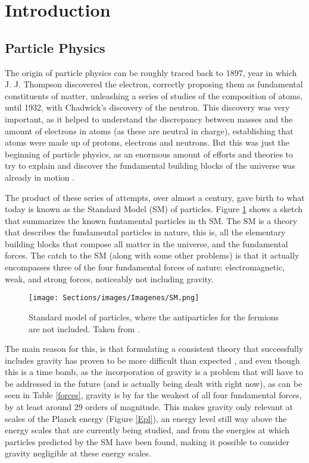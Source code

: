 \clearpage
\vspace{1cm}
\section{Introduction} \label{sec:intro}
\vspace{1cm}

\subsection{Particle Physics} \label{ssec:partphys}

The origin of particle physics can be roughly traced back to 1897, year in which J. J. Thompson discovered the electron, correctly proposing them as fundamental constituents of matter, unleashing a series of studies of the composition of atoms, until 1932, with Chadwick's discovery of the neutron. This discovery was very important, as it helped to understand the discrepancy between masses and the amount of electrons in atoms (as these are neutral in charge), establishing that atoms were made up of protons, electrons and neutrons. But this was just the beginning of particle physics, as an enormous amount of efforts and theories to try to explain and discover the fundamental building blocks of the universe was already in motion \cite{Griffiths}.

The product of these series of attempts, over almost a century, gave birth to what today is known as the Standard Model (SM) of particles. Figure \ref{SM} shows a sketch that summarizes the known funtamental particles in th SM. The SM is a theory that describes the fundamental particles in nature, this is, all the elementary building blocks that compose all matter in the universe, and the fundamental forces. The catch to the SM (along with some other problems) is that it actually encompasses three of the four fundamental forces of nature: electromagnetic, weak, and strong forces, noticeably not including gravity.

\begin{figure}[ht]
    \centering
    \texttt{[image: Sections/images/Imagenes/SM.png]}
    \vspace{-1\baselineskip}
    \caption{Standard model of particles, where the antiparticles for the fermions are not included. Taken from \cite{Goldberg}.}
    \label{SM}
\end{figure}

The main reason for this, is that formulating a consistent theory that successfully includes gravity has proven to be more difficult than expected \cite{Griffiths}, and even though this is a time bomb, as the incorporation of gravity is a problem that will have to be addressed in the future (and is actually being dealt with right now), as can be seen in Table \ref{forces}, gravity is by far the weakest of all four fundamental forces, by at least around 29 orders of magnitude. This makes gravity only relevant at scales of the Planck energy (Figure \ref{Epl}), an energy level still way above the energy scales that are currently being studied, and from the energies at which particles predicted by the SM have been found, making it possible to consider gravity negligible at these energy scales.

